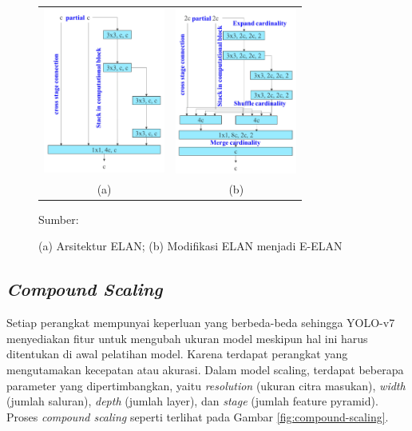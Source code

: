     \begin{figure}[H]
        \centering
        \begin{tabular}{cc}
            \includegraphics[width=4cm]{../img/ELAN - Latex.PNG}
            &
            \includegraphics[width=4cm]{../img/E-ELAN - Latex.PNG}\\
            (a) &(b)\\
        \end{tabular}
        \caption{(a) Arsitektur ELAN; (b) Modifikasi ELAN menjadi E-ELAN}
        \label{fig:e-elan}
        Sumber: \citep{Wang2022}
    \end{figure}

    \subsection{\textit{Compound Scaling}}
    Setiap perangkat mempunyai keperluan yang berbeda-beda sehingga YOLO-v7 menyediakan fitur untuk mengubah ukuran model meskipun hal ini harus ditentukan di awal pelatihan model. Karena terdapat perangkat yang mengutamakan kecepatan atau akurasi. Dalam model scaling, terdapat beberapa parameter yang dipertimbangkan, yaitu \textit{resolution} (ukuran citra masukan), \textit{width} (jumlah saluran), \textit{depth} (jumlah layer), dan \textit{stage} (jumlah feature pyramid). Proses \textit{compound scaling} seperti terlihat pada Gambar \ref{fig:compound-scaling}.
    
